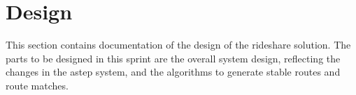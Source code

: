 \section{Design}

This section contains documentation of the design of the rideshare solution.
The parts to be designed in this sprint are the overall system design, reflecting the changes in the \gls{astep} system, and the algorithms to generate stable routes and route matches.





